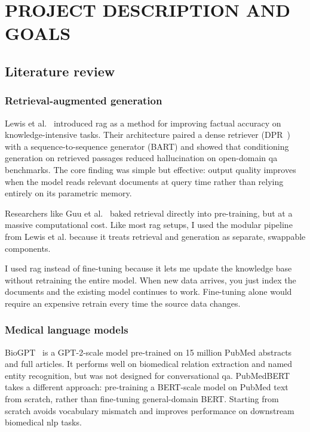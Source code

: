 \chapter{\MakeUppercase{Project Description and Goals}}

\section{Literature review}

\subsection{Retrieval-augmented generation}

Lewis et al.~\cite{lewis2020rag} introduced \ac{rag} as a method for improving factual accuracy on knowledge-intensive tasks. Their architecture paired a dense retriever (DPR~\cite{karpukhin2020dpr}) with a sequence-to-sequence generator (BART) and showed that conditioning generation on retrieved passages reduced hallucination on open-domain \ac{qa} benchmarks. The core finding was simple but effective: output quality improves when the model reads relevant documents at query time rather than relying entirely on its parametric memory.

Researchers like Guu et al.~\cite{guu2020realm} baked retrieval directly into pre-training, but at a massive computational cost. Like most \ac{rag} setups, I used the modular pipeline from Lewis et al. because it treats retrieval and generation as separate, swappable components.

I used \ac{rag} instead of fine-tuning because it lets me update the knowledge base without retraining the entire model. When new data arrives, you just index the documents and the existing model continues to work. Fine-tuning alone would require an expensive retrain every time the source data changes.

\subsection{Medical language models}

BioGPT~\cite{luo2022biogpt} is a GPT-2-scale model pre-trained on 15 million PubMed abstracts and full articles. It performs well on biomedical relation extraction and named entity recognition, but was not designed for conversational \ac{qa}. PubMedBERT~\cite{gu2021pubmedbert} takes a different approach: pre-training a BERT-scale model on PubMed text from scratch, rather than fine-tuning general-domain BERT. Starting from scratch avoids vocabulary mismatch and improves performance on downstream biomedical \ac{nlp} tasks.

